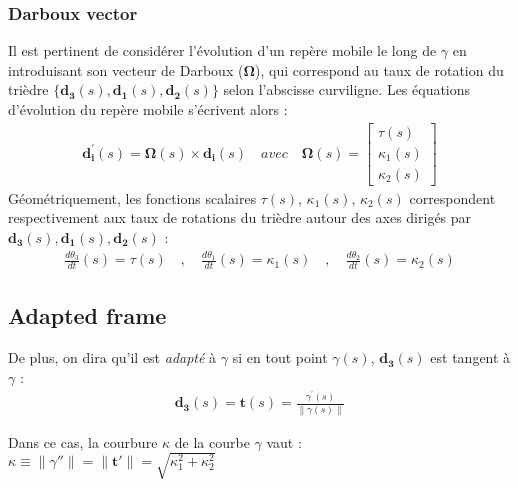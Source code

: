 
\subsubsection{Darboux vector}
Il est pertinent de considérer l'évolution d'un repère mobile le long de $\gamma$ en introduisant son vecteur de Darboux ($\mathbf{\Omega}$), qui correspond au taux de rotation du trièdre $\{\mathbf{d_{3}}(s),\mathbf{d_{1}}(s),\mathbf{d_{2}}(s) \}$ selon l'abscisse curviligne. Les équations d'évolution du repère mobile s'écrivent alors :
\begin{gather}
\mathbf{d_{i}^{'}}(s) = \mathbf{\Omega}(s) \times \mathbf{d_{i}}(s)
\quad avec \quad
\mathbf{\Omega}(s) 
= 
\left[\begin{array}{c}
\tau(s) \\
\kappa_{1}(s) \\
\kappa_{2}(s)
\end{array}\right]
\end{gather}
Géométriquement, les fonctions scalaires $\tau(s)$, $\kappa_{1}(s)$, $\kappa_{2}(s)$  correspondent respectivement aux taux de rotations du trièdre autour des axes dirigés par $\mathbf{d_{3}}(s),\mathbf{d_{1}}(s),\mathbf{d_{2}}(s)$ :
\begin{gather}
\frac{d\theta_3}{dt}(s) = \tau(s)
\quad,\quad
\frac{d\theta_1}{dt}(s) = \kappa_{1}(s)
\quad,\quad
\frac{d\theta_2}{dt}(s) = \kappa_{2}(s)
\end{gather}

\subsection{Adapted frame}
De plus, on dira qu'il est \emph{adapté} à $\gamma$ si en tout point $\gamma(s)$, $\mathbf{d_{3}}(s)$ est tangent à $\gamma$ :
\begin{gather}
\mathbf{d_{3}}(s) = \mathbf{t}(s) = \frac{\gamma^{'}(s)}{\|\gamma(s)\|}
\end{gather}

Dans ce cas, la courbure $\kappa$ de la courbe $\gamma$ vaut : $\kappa \equiv \|\gamma''\| = \|\mathbf{t'}\| = \sqrt{\kappa_1^2 + \kappa_2^2}$

